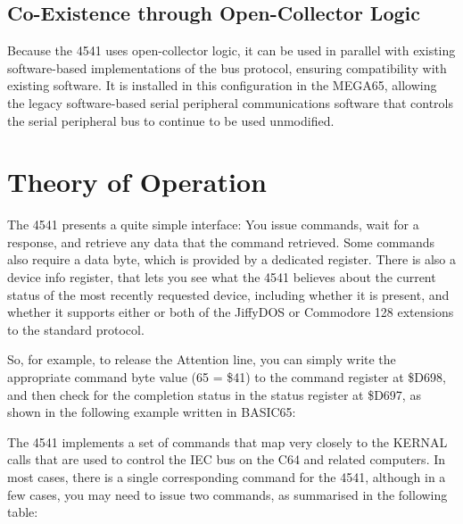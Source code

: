 \subsection{Co-Existence through Open-Collector Logic}

Because the 4541 uses open-collector
logic, it can be used in parallel with existing software-based
implementations of the bus protocol, ensuring compatibility with
existing software.  It is installed in this configuration in the
MEGA65, allowing the legacy software-based serial peripheral
communications software that controls the serial peripheral bus to
continue to be used unmodified. 

\section{Theory of Operation}

The 4541 presents a quite simple interface: You issue commands, wait
for a response, and retrieve any data that the command
retrieved.  Some commands also require a data byte, which is provided
by a dedicated register.  There is also a device info register, that lets you see
what the 4541 believes about the current status of the most recently
requested device, including whether it is present, and whether it
supports either or both of the JiffyDOS{\texttrademark} or
Commodore{\textrademark} 128 extensions to the standard protocol.

So, for example, to release the Attention line, you can simply write
the appropriate command byte value (65 = \$41) to the command register
at \$D698, and then check for the completion status in the status
register at \$D697, as shown in the following example written in
BASIC65:


The 4541 implements a set of commands that map very closely to the
KERNAL calls that are used to control the IEC bus on the C64 and
related computers.  In most cases, there is a single corresponding
command for the 4541, although in a few cases, you may need to issue
two commands, as summarised in the following table:

